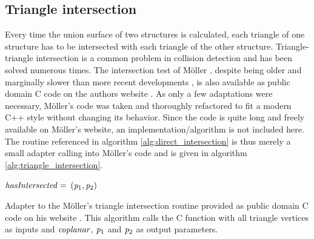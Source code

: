\subsection{Triangle intersection}
\label{sec:triangle_intersection}

Every time the union surface of two structures is calculated, each triangle of one structure has to be intersected with each triangle of the other structure.
Triangle-triangle intersection is a common problem in collision detection and has been solved numerous times.
The intersection test of Möller \cite{tri_tri_intersection_moller}, despite being older and marginally slower than more recent developments \cite{tri_tri_intersection_2}, is also available as public domain C code on the authors website \cite{tri_tri_intersection_moller_code}.
As only a few adaptations were necessary, Möller's code was taken and thoroughly refactored to fit a modern C++ style without changing its behavior.
Since the code is quite long and freely available on Möller's website, an implementation/algorithm is not included here.
The  routine referenced in algorithm \ref{alg:direct_intersection} is thus merely a small adapter calling into Möller's code and is given in algorithm \ref{alg:triangle_intersection}.

\begin{algorithm}
	\centering
	\begin{algorithmic}[1]
			\State $\mathit{hasIntersected} =$  
				\State \Return $(\mathit{p}_1, \mathit{p}_2)$ 
			\EndIf
		\EndFunction
	\end{algorithmic}
	\caption{
		Adapter to the Möller's triangle intersection routine provided as public domain C code on his website \cite{tri_tri_intersection_moller_code}.
		This algorithm calls the C function  with all triangle vertices as inputs and $\mathit{coplanar}$, $\mathit{p}_1$ and $\mathit{p}_2$ as output parameters.
	}
	\label{alg:triangle_intersection}
\end{algorithm}

